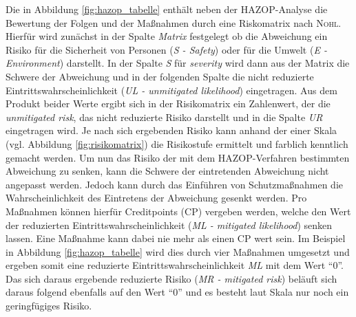 Die in Abbildung \ref{fig:hazop_tabelle} enthält neben der HAZOP-Analyse die Bewertung der Folgen und der Maßnahmen durch eine Riskomatrix nach \textsc{Nohl}. Hierfür wird zunächst in der Spalte \textit{Matrix} festgelegt ob die Abweichung ein Risiko für die Sicherheit von Personen (\textit{S - Safety}) oder für die Umwelt (\textit{E - Environment}) darstellt. In der Spalte \textit{S} für \textit{severity} wird dann aus der Matrix die Schwere der Abweichung und in der folgenden Spalte die nicht reduzierte Eintrittswahrscheinlichkeit (\textit{UL - unmitigated likelihood}) eingetragen. Aus dem Produkt beider Werte ergibt sich in der Risikomatrix ein Zahlenwert, der die \textit{unmitigated risk}, das nicht reduzierte Risiko darstellt und in die Spalte \textit{UR} eingetragen wird. Je nach sich ergebenden Risiko kann anhand der einer Skala (vgl. Abbildung \ref{fig:risikomatrix}) die Risikostufe ermittelt und farblich kenntlich gemacht werden.\linebreak
Um nun das Risiko der mit dem HAZOP-Verfahren bestimmten Abweichung zu senken, kann die Schwere der eintretenden Abweichung nicht angepasst werden. Jedoch kann durch das Einführen von Schutzmaßnahmen die Wahrscheinlichkeit des Eintretens der Abweichung gesenkt werden. Pro Maßnahmen können hierfür Creditpoints (CP) vergeben werden, welche den Wert der reduzierten Eintrittswahrscheinlichkeit (\textit{ML - mitigated likelihood}) senken lassen. Eine Maßnahme kann dabei nie mehr als einen CP wert sein. Im Beispiel in Abbildung \ref{fig:hazop_tabelle} wird dies durch vier Maßnahmen umgesetzt und ergeben somit eine reduzierte Eintrittswahrscheinlichkeit \textit{ML} mit dem Wert "`0"'. Das sich daraus ergebende reduzierte Risiko (\textit{MR - mitigated risk}) beläuft sich daraus folgend ebenfalls auf den Wert "`0"' und es besteht laut Skala nur noch ein geringfügiges Risiko.

